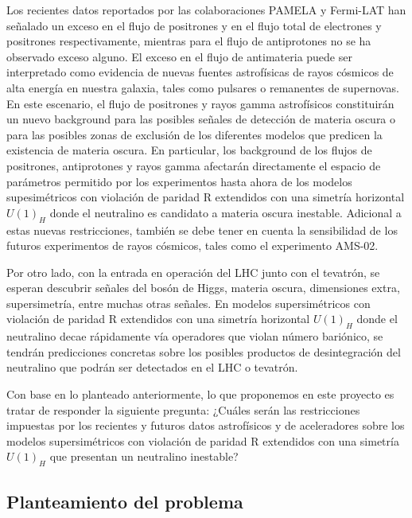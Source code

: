 Los recientes datos reportados por las colaboraciones PAMELA y Fermi-LAT
han señalado un exceso en el flujo de positrones y en el flujo total de
electrones y positrones respectivamente, mientras para el flujo de antiprotones no se
ha observado exceso alguno. El exceso en el flujo de antimateria puede ser
interpretado como evidencia de nuevas fuentes astrofísicas de rayos cósmicos de
alta energía en nuestra galaxia, tales como pulsares o remanentes de supernovas.
En este escenario, el flujo de positrones y rayos gamma astrofísicos constituirán
un nuevo background para las posibles señales de detección de materia oscura o para las posibles zonas
de exclusión de los diferentes modelos que predicen la existencia de materia oscura. En particular,
los background de los flujos de positrones, antiprotones y rayos gamma afectarán directamente
el espacio de parámetros permitido por los experimentos hasta ahora de los modelos
supesimétricos con violación de paridad R extendidos con una simetría horizontal
$U(1)_H$ donde el neutralino es candidato a materia oscura inestable. Adicional a
estas nuevas restricciones, también se debe tener en cuenta la sensibilidad de
los futuros experimentos de rayos cósmicos, tales como el experimento AMS-02.

Por otro lado, con la entrada en operación del LHC junto con el tevatrón,
se esperan descubrir señales del bosón de Higgs, materia oscura, dimensiones extra,
supersimetría, entre muchas otras señales.  En modelos supersimétricos con violación de paridad R
extendidos con una simetría horizontal $U(1)_H$ donde el neutralino decae rápidamente vía operadores
que violan número bariónico, se tendrán predicciones concretas sobre los posibles productos de
desintegración del neutralino que podrán ser detectados en el LHC o tevatrón.

Con base en lo planteado anteriormente, lo que proponemos en este proyecto es
tratar de responder la siguiente pregunta: ¿Cuáles serán las restricciones
impuestas por los recientes y futuros datos astrofísicos y de aceleradores sobre
los modelos supersimétricos con violación de paridad R extendidos con una simetría $U(1)_H$ que presentan un neutralino inestable?

\subsection{Planteamiento del problema}


